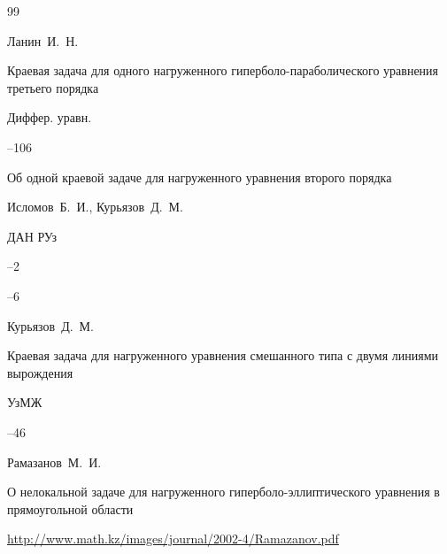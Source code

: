 \begin{thebibliography}{99}








\by Ланин~И.~Н.

\paper Краевая задача для одного нагруженного гиперболо-параболического уравнения третьего порядка

\jour Диффер. уравн.




--106







\paper Об одной краевой задаче для нагруженного уравнения второго порядка

\by Исломов~Б.~И., Курьязов~Д.~М.

\jour ДАН РУз


--2

--6




\by Курьязов~Д.~М.

\paper Краевая задача для нагруженного уравнения смешанного типа с двумя линиями вырождения

\jour УзМЖ



--46











\by Рамазанов~М.~И.

\paper О нелокальной задаче для нагруженного гиперболо-эллиптического уравнения в прямоугольной области

\elink \url{http://www.math.kz/images/journal/2002-4/Ramazanov.pdf}


\end{thebibliography}
